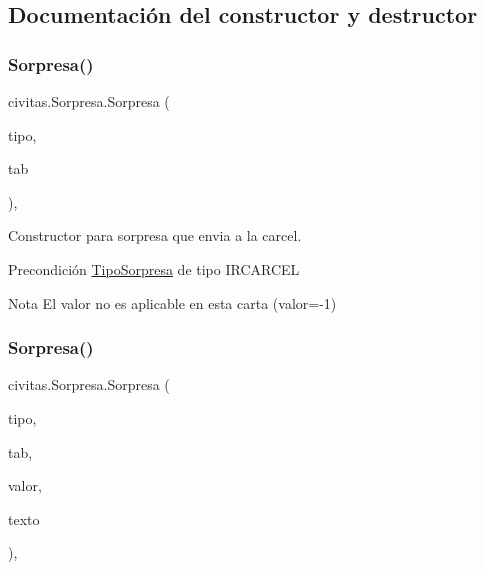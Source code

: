 \subsection{Documentación del constructor y destructor}
\mbox{\label{classcivitas_1_1Sorpresa_a5789cc629379aedcc8577e748e966fdc}} 
\subsubsection{\texorpdfstring{Sorpresa()}{Sorpresa()}\hspace{0.1cm}{\footnotesize\ttfamily [1/4]}}
{\footnotesize\ttfamily civitas.\+Sorpresa.\+Sorpresa (\begin{DoxyParamCaption}\item[{\hyperlink{enumcivitas_1_1TipoSorpresa}{Tipo\+Sorpresa}}]{tipo,  }\item[{\hyperlink{classcivitas_1_1Tablero}{Tablero}}]{tab }\end{DoxyParamCaption})\hspace{0.3cm}{\ttfamily [inline]}, {\ttfamily [package]}}

Constructor para sorpresa que envia a la carcel. \begin{DoxyPrecond}{Precondición}
\hyperlink{enumcivitas_1_1TipoSorpresa}{Tipo\+Sorpresa} de tipo I\+R\+C\+A\+R\+C\+EL 
\end{DoxyPrecond}
\begin{DoxyNote}{Nota}
El valor no es aplicable en esta carta (valor=-\/1) 
\end{DoxyNote}
\mbox{\label{classcivitas_1_1Sorpresa_adf70459739c97667854e3bc341d0e75d}} 
\subsubsection{\texorpdfstring{Sorpresa()}{Sorpresa()}\hspace{0.1cm}{\footnotesize\ttfamily [2/4]}}
{\footnotesize\ttfamily civitas.\+Sorpresa.\+Sorpresa (\begin{DoxyParamCaption}\item[{\hyperlink{enumcivitas_1_1TipoSorpresa}{Tipo\+Sorpresa}}]{tipo,  }\item[{\hyperlink{classcivitas_1_1Tablero}{Tablero}}]{tab,  }\item[{int}]{valor,  }\item[{String}]{texto }\end{DoxyParamCaption})\hspace{0.3cm}{\ttfamily [inline]}, {\ttfamily [package]}}

